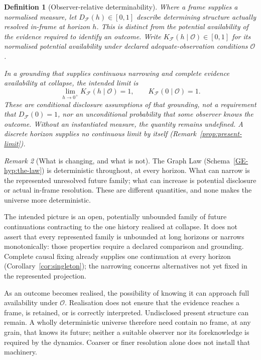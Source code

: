 \documentclass[11pt,a4paper]{article}
\newtheorem{definition}{Definition}[section]
\theoremstyle{remark}
\newtheorem{remark}[definition]{Remark}
\newcommand{\Frame}{\mathcal F}
\begin{document}
\begin{definition}[Observer-relative determinability]\label{def:determinability}
Where a frame supplies a normalised measure, let $D_{\Frame}(h)\in[0,1]$
describe determining structure actually resolved in-frame at horizon $h$.
This is distinct from the potential availability of the evidence required to
identify an outcome. Write $K_{\Frame}(h\mid\mathcal O)\in[0,1]$ for its normalised potential availability
under declared adequate-observation conditions $\mathcal O$.

In a grounding that supplies continuous narrowing and complete evidence
availability at collapse, the intended limit is
\[
\lim_{h\to0^{+}}K_{\Frame}(h\mid\mathcal O)=1,
\qquad
K_{\Frame}(0\mid\mathcal O)=1.
\]
These are conditional disclosure assumptions of that grounding, not a
requirement that $D_{\Frame}(0)=1$, nor an unconditional probability that
some observer knows the outcome. Without an instantiated measure, the
quantity remains undefined. A discrete horizon supplies no continuous limit
by itself (Remark~\ref{prop:present-limit}).
\end{definition}

\begin{remark}[What is changing, and what is not]\label{rem:not-more-deterministic}
The Graph Law (Schema~\ref{GE-hyp:the-law}) is deterministic throughout, at
every horizon. What can narrow is the represented unresolved future family;
what can increase is potential disclosure or actual in-frame resolution.
These are different quantities, and none makes the universe more deterministic.

The intended picture is an open, potentially unbounded family of future
continuations contracting to the one history realised at collapse. It does
not assert that every represented family is unbounded at long horizons or
narrows monotonically: those properties require a declared comparison and
grounding. Complete causal fixing already supplies one continuation at every
horizon (Corollary~\ref{cor:singleton}); the narrowing concerns alternatives
not yet fixed in the represented projection.

As an outcome becomes realised, the possibility of knowing it can approach
full availability under $\mathcal O$. Realisation does not ensure that the
evidence reaches a frame, is retained, or is correctly interpreted. Undisclosed
present structure can remain. A wholly deterministic universe therefore need
contain no frame, at any grain, that knows its future; neither a suitable
observer nor its foreknowledge is required by the dynamics. Coarser or finer
resolution alone does not install that machinery.
\end{remark}
\end{document}
